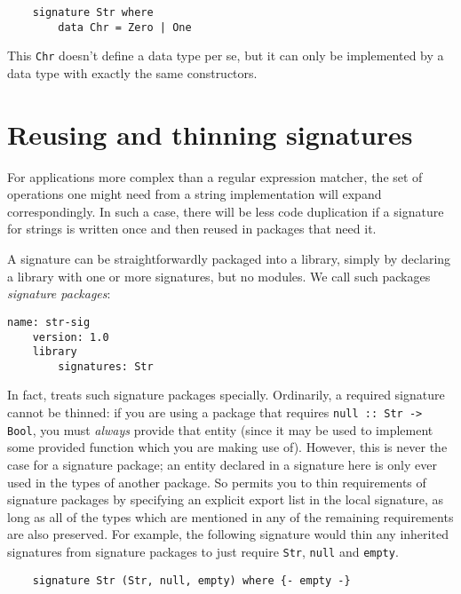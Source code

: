 \begin{lstlisting}
    signature Str where
        data Chr = Zero | One
\end{lstlisting}

\noindent
This \verb|Chr| doesn't define a data type per se, but it can only
be implemented by a data type with exactly the same constructors.

\section{Reusing and thinning signatures}

For applications more complex than a regular expression matcher, the set
of operations one might need from a string implementation will expand
correspondingly.  In such a case, there will be less code duplication if
a signature for strings is written once and then reused in packages that
need it.

A signature can be straightforwardly packaged into a library, simply
by declaring a library with one or more signatures, but no modules.
We call such packages \emph{signature packages}:

\begin{lstlisting}[language=Cabal]
    name: str-sig
    version: 1.0
    library
        signatures: Str
\end{lstlisting}

\noindent
In fact, \Backpack{} treats such signature packages specially.
Ordinarily, a required signature cannot be thinned: if you are using a
package that requires \verb|null :: Str -> Bool|, you must \emph{always}
provide that entity (since it may be used to implement some provided
function which you are making use of).  However, this is never the case
for a signature package; an entity declared in a signature here is only
ever used in the types of another package.  So \Backpack{} permits you
to thin requirements of signature packages by specifying an explicit
export list in the local signature, as long as all of the types which
are mentioned in any of the remaining requirements are also preserved.
For example, the following signature would thin any inherited signatures
from signature packages to just require \verb|Str|, \verb|null| and
\verb|empty|.

\begin{lstlisting}
    signature Str (Str, null, empty) where {- empty -}
\end{lstlisting}

